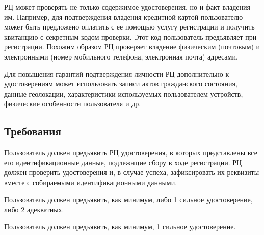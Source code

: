 РЦ может проверять не только содержимое удостоверения, но и факт владения 
им. Например, для подтверждения владения кредитной картой пользователю 
может быть предложено оплатить с ее помощью услугу регистрации и 
получить квитанцию с секретным кодом проверки. Этот код пользователь 
предъявляет при регистрации.
%
Похожим образом РЦ проверяет владение физическим (почтовым) 
и электронными (номер мобильного телефона, электронная почта) адресами.

Для повышения гарантий подтверждения личности РЦ дополнительно к 
удостоверениям может использовать записи актов гражданского состояния, 
данные геолокации, характеристики используемых пользователем устройств, 
физические особенности пользователя и др.
%


\subsection{Требования}\label{IP.Reqs}


Пользователь должен предъявить РЦ удостоверения, в которых 
представлены все его идентификационные данные, подлежащие сбору в 
ходе регистрации. 
%
РЦ должен проверить удостоверения и, в случае успеха, зафиксировать
их реквизиты вместе с собираемыми идентификационными данными.

%

Пользователь должен предъявить, как минимум, либо 1 сильное удостоверение,
либо 2 адекватных.


Пользователь должен предъявить, как минимум, 1 сильное удостоверение.

